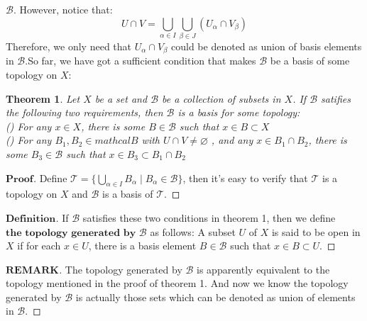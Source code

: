 \documentclass[a4paper, 11pt]{article}
\newtheorem{theorem}{Theorem}
\theoremstyle{definition}
\theoremstyle{remark}
\newenvironment{myremark}
{\renewcommand\qedsymbol{$ $}\begin{proof}[$\mathbf{REMARK}$]}
  {\end{proof}}
\newenvironment{myprf}
{\renewcommand\qedsymbol{$ $}\begin{proof}[$\mathbf{Proof}$]}
  {\end{proof}}
\newenvironment{mydef}
{\renewcommand\qedsymbol{$ $}\begin{proof}[$\mathbf{Definition}$]}
  {\end{proof}}
\theoremstyle{definition}
\begin{document}
$\mathcal{B}$. However, notice that:
$$
U\cap V=\bigcup_{\alpha\in I}\bigcup_{\beta\in J}(U_{\alpha}\cap V_{\beta})
$$ Therefore, we only need that $U_{\alpha}\cap V_{\beta}$ could be denoted as union of basis elements in $\mathcal{B}$.So far, we have got a sufficient condition 
that makes $\mathcal{B}$ be a basis of some topology on $X$:
\begin{theorem}
        Let $X$ be a set and $\mathcal{B}$ be a collection of subsets in $X$. If
        $\mathcal{B}$ satifies the following two requirements, then $\mathcal{B}$
        is a basis for some topology:\\
        () For any $x\in X$, there is some $B\in \mathcal{B}$ 
        such that $x\in B\subset X$\\
        () For any $B_1,B_2\in mathcal{B}$ with $U\cap V\neq \varnothing$
        , and any $x\in B_1\cap B_2$, there is some $B_3\in \mathcal{B}$ such that
        $x\in B_3\subset B_1\cap B_2$
\end{theorem}
\begin{myprf}
       Define $\mathcal{T}=\{\bigcup_{\alpha\in I} B_{\alpha}\mid B_{\alpha}\in
       \mathcal{B}\}$, then it's easy to verify that $\mathcal{T}$ is a topology
       on $X$ and $\mathcal{B}$ is a basis of $\mathcal{T}$.
\end{myprf}
\vspace{0.5cm}
\begin{mydef}
       If $\mathcal{B}$ satisfies these two conditions in theorem 1, then we
       define $\textbf{the topology} $ $\textbf{generated by}$ $\mathcal{B}$ as
       follows: A subset $U$ of $X$ is said to be open in $X$ if for each 
       $x\in U$, there is a basis element $B\in \mathcal{B}$ such that 
       $x\in B\subset U$.
\end{mydef}
\begin{myremark}
        The topology generated by $\mathcal{B}$ is apparently equivalent
        to the topology mentioned in the proof of theorem 1. And now we know
        the topology generated by $\mathcal{B}$ is actually those sets which
        can be denoted as union of elements in $\mathcal{B}$.
\end{myremark}
\end{document}
